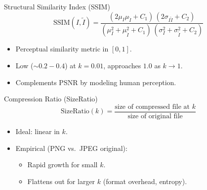 \documentclass[12pt]{beamer}
\begin{document}
\begin{frame}{Structural Similarity Index (SSIM)}
  \[
    \mathrm{SSIM}(I,\tilde I)
    = \frac{(2\mu_I\mu_{\tilde I}+C_1)\,(2\sigma_{I\tilde I}+C_2)}
           {(\mu_I^2 + \mu_{\tilde I}^2 + C_1)\,(\sigma_I^2 + \sigma_{\tilde I}^2 + C_2)}
  \]
  \vspace{1em}
  \begin{itemize}
    \item Perceptual similarity metric in \([0,1]\).
    \item Low (\(\sim0.2\!-\!0.4\)) at \(k=0.01\), approaches \(1.0\) as \(k\to1\).
    \item Complements PSNR by modeling human perception.
  \end{itemize}
\end{frame}

\begin{frame}{Compression Ratio (SizeRatio)}
  \[
    \mathrm{SizeRatio}(k)
    = \frac{\text{size of compressed file at }k}
           {\text{size of original file}}
  \]
  \vspace{1em}
  \begin{itemize}
    \item Ideal: linear in \(k\).
    \item Empirical (PNG vs.\ JPEG original):
      \begin{itemize}
        \item Rapid growth for small \(k\).
        \item Flattens out for larger \(k\) (format overhead, entropy).
      \end{itemize}
  \end{itemize}
\end{frame}
\end{document}

